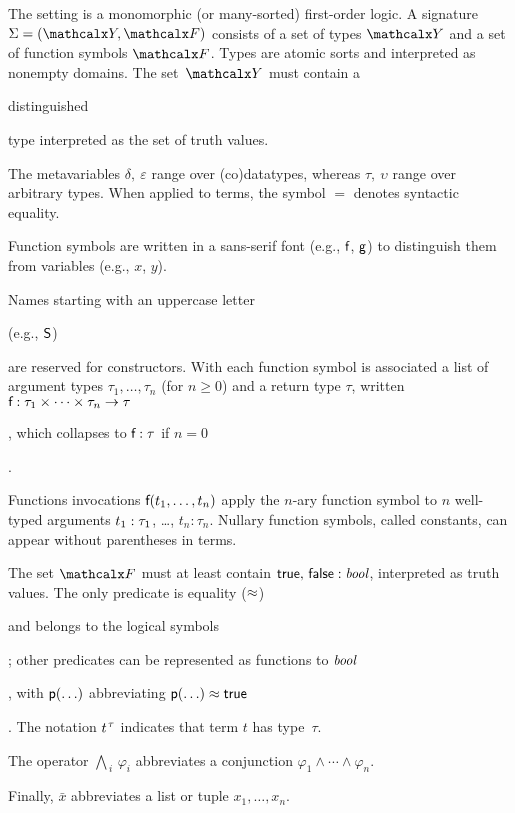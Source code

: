 The setting is a monomorphic (or many-sorted) first-order logic.
A signature $\Sig = (\Types, \Funcs)$ consists of a set of types $\Types$ and a
set of function symbols $\Funcs$. Types are atomic sorts and interpreted as
nonempty domains. The set~$\Types$ must contain a
\begin{rep}distinguished \end{rep}type  interpreted as the set of truth
values. %
\begin{rep}
The metavariables $\delta,\:\varepsilon$ range over (co)datatypes,
whereas $\tau,\:\upsilon$ range over arbitrary types.
When applied to terms, the symbol $=$ denotes syntactic equality.

Function symbols are written in a sans-serif font (e.g., $\textsf{f}$, $\textsf{g}$) to
distinguish them from variables (e.g., $x$, $y$).
\end{rep}
Names starting with an uppercase letter \begin{rep}(e.g.,
$\textsf{S}$) \end{rep}are reserved for constructors. With each function symbol 
is associated a list of argument types $\tau_1,\ldots,\tau_n$ (for $n \ge 0$)
and a return type $\tau$, written
$\textsf{f} : \tau_1 \times \cdots \times \tau_n \to \tau$\begin{rep},
which collapses to $\textsf{f} : \tau$ if $n = 0$\end{rep}.
\begin{rep}%
Functions invocations $\textsf{f}(t_1,\ldots,t_n)$
apply the $n$-ary function symbol
 to $n$ well-typed arguments $t_1 :\nobreak \tau_1$, \ldots, $t_n :
\tau_n$. Nullary function symbols, called constants, can appear without
parentheses in terms.
\end{rep}
The set $\Funcs$ must at least contain
$\textsf{true},\, \textsf{false} : \textit{bool}$, interpreted as truth values.
The only predicate is equality ($\approx$)\begin{rep} and belongs to the logical symbols\end{rep};
other predicates can be represented as functions to $\textit{bool}$\begin{rep},
with $\textsf{p}(\ldots)$ abbreviating $\textsf{p}(\ldots) \approx \textsf{true}$\end{rep}.
The notation $t\typ{\tau}$ indicates that term $t$ has type~$\tau$.
\begin{rep}The operator $\bigwedge_{\,i}\, \varphi_i$ abbreviates a conjunction
$\varphi_1 \mathrel\land \cdots \mathrel\land \varphi_n$. \end{rep}%
Finally, $\bar x$ abbreviates a list or tuple $x_1,\ldots,x_n$.


